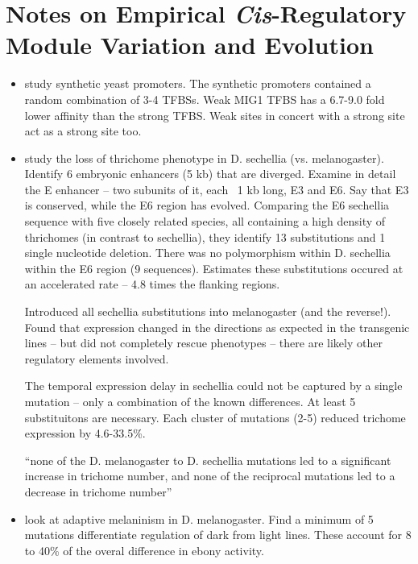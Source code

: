 \documentclass[9 pt]{article}
\newcommand{\1}{\mathbbm{1}}
\begin{document}
  \section{Notes on Empirical \emph{Cis}-Regulatory Module Variation and Evolution}

    \begin{itemize}
      \item \citet{gertz2009analysis} study synthetic yeast promoters. The synthetic promoters contained a random combination of 3-4 TFBSs. Weak MIG1 TFBS has a 6.7-9.0 fold lower affinity than the strong TFBS. Weak sites in concert with a strong site act as a strong site too. 

      \item \citet{frankel2011morphological} study the loss of thrichome phenotype in D. sechellia (vs. melanogaster). Identify 6 embryonic enhancers (5 kb) that are diverged. Examine in detail the E enhancer -- two subunits of it, each ~1 kb long, E3 and E6. Say that E3 is conserved, while the E6 region has evolved. Comparing the E6 sechellia sequence with five closely related species, all containing a high density of thrichomes (in contrast to sechellia), they identify 13 substitutions and 1 single nucleotide deletion. There was no polymorphism within D. sechellia within the E6 region (9 sequences). Estimates these substitutions occured at an accelerated rate -- 4.8 times the flanking regions. 

        Introduced all sechellia substitutions into melanogaster (and the reverse!). Found that expression changed in the directions as expected in the transgenic lines -- but did not completely rescue phenotypes -- there are likely other regulatory elements involved. 

        The temporal expression delay in sechellia could not be captured by a single mutation -- only a combination of the known differences. At least 5 substituitons are necessary. Each cluster of mutations (2-5) reduced trichome expression by 4.6-33.5\%. 

        ``none of the D. melanogaster to D. sechellia mutations led to a significant increase in trichome number, and none of the reciprocal mutations led to a decrease in trichome number''

      \item \citet{rebeiz2009stepwise} look at adaptive melaninism in D. melanogaster. 
        Find a minimum of 5 mutations differentiate regulation of dark from light lines. These account for 8 to 40\% of the overal difference in ebony activity. 


\end{itemize}
\end{document}

